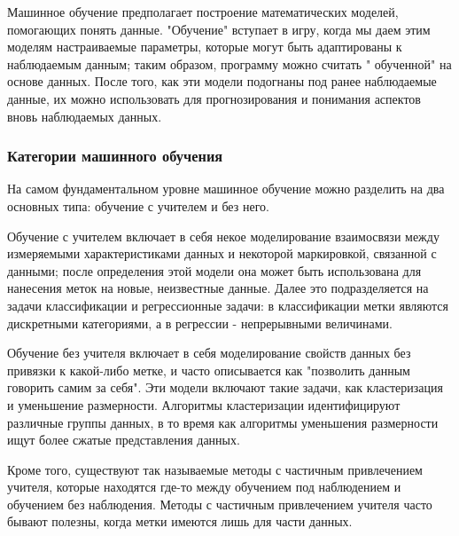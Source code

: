 Машинное обучение предполагает построение математических моделей, помогающих понять данные. "Обучение" вступает в игру, когда мы даем этим моделям настраиваемые параметры, которые могут быть адаптированы к наблюдаемым данным; таким образом, программу можно считать " обученной" на основе данных. После того, как эти модели подогнаны под ранее наблюдаемые данные, их можно использовать для прогнозирования и понимания аспектов вновь наблюдаемых данных.

\subsubsection{Категории машинного обучения}
На самом фундаментальном уровне машинное обучение можно разделить на два основных типа: обучение с учителем и без него.


Обучение с учителем включает в себя некое моделирование взаимосвязи между измеряемыми характеристиками данных и некоторой маркировкой, связанной с данными; после определения этой модели она может быть использована для нанесения меток на новые, неизвестные данные. Далее это подразделяется на задачи классификации и регрессионные задачи: в классификации метки являются дискретными категориями, а в регрессии - непрерывными величинами. 


Обучение без учителя включает в себя моделирование свойств данных без привязки к какой-либо метке, и часто описывается как "позволить данным говорить самим за себя". Эти модели включают такие задачи, как кластеризация и уменьшение размерности. Алгоритмы кластеризации идентифицируют различные группы данных, в то время как алгоритмы уменьшения размерности ищут более сжатые представления данных.


Кроме того, существуют так называемые методы с частичным привлечением учителя, которые находятся где-то между обучением под наблюдением и обучением без наблюдения. Методы с частичным привлечением учителя часто бывают полезны, когда метки имеются лишь для части данных.









